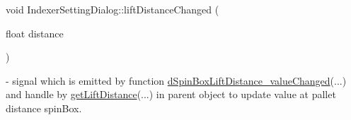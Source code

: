 \mbox{\label{classIndexerSettingDialog_a8d5a19a8948b46f84de79d40775f05c5}} 
{\footnotesize\ttfamily void Indexer\+Setting\+Dialog\+::\texorpdfstring{lift\+Distance\+Changed}{liftDistanceChanged} (\begin{DoxyParamCaption}\item[{float}]{distance }\end{DoxyParamCaption}){\ttfamily [signal]}} - signal which is emitted by function \hyperlink{classIndexerSettingDialog_a4cc32d94f2a3d8ed8cf99665f3d95d99}{d\+Spin\+Box\+Lift\+Distance\+\_\+value\+Changed}(...) and handle by \hyperlink{classMainWindow_a11a73a8f479b8952951f29df988ff2c3}{get\+Lift\+Distance}(...) in parent object to update value at pallet distance spin\+Box.


